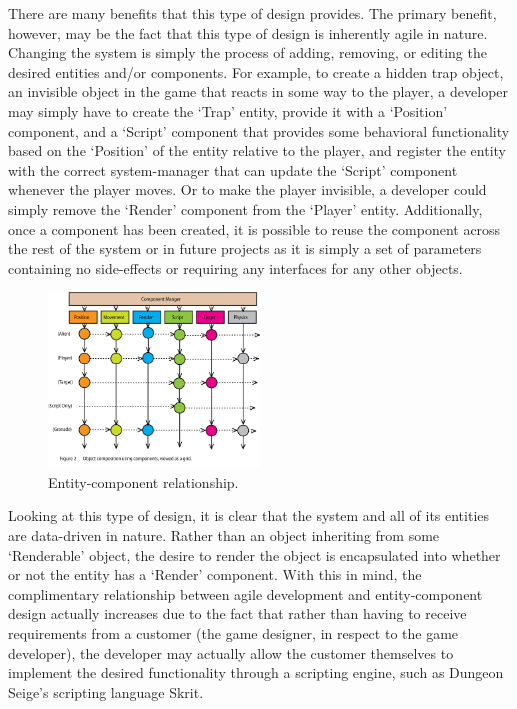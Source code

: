 There are many benefits that this type of design provides. The primary benefit, however, may be the fact that this type of design is inherently agile in nature. Changing the system is simply the process of adding, removing, or editing the desired entities and/or components. For example, to create a hidden trap object, an invisible object in the game that reacts in some way to the player, a developer may simply have to create the `Trap' entity, provide it with a `Position' component, and a `Script' component that provides some behavioral functionality based on the `Position' of the entity relative to the player, and register the entity with the correct system-manager that can update the `Script' component whenever the player moves. Or to make the player invisible, a developer could simply remove the `Render' component from the `Player' entity. Additionally, once a component has been created, it is possible to reuse the component across the rest of the system or in future projects as it is simply a set of parameters containing no side-effects or requiring any interfaces for any other objects.

\begin{figure}[!ht]
  \centering \includegraphics[width=0.5\textwidth]{Images/aggregation.png}
  \caption{Entity-component relationship.\cite{evolve_your_hierarchy}}
\end{figure}

Looking at this type of design, it is clear that the system and all of its entities are data-driven in nature. Rather than an object inheriting from some `Renderable' object, the desire to render the object is encapsulated into whether or not the entity has a `Render' component. With this in mind, the complimentary relationship between agile development and entity-component design actually increases due to the fact that rather than having to receive requirements from a customer (the game designer, in respect to the game developer), the developer may actually allow the customer themselves to implement the desired functionality through a scripting engine, such as Dungeon Seige's scripting language Skrit.

